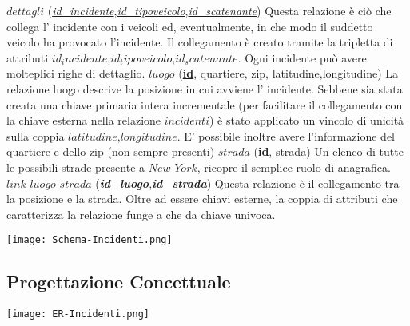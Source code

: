 \documentclass[12pt, a4paper]{scrartcl}
\begin{document}
\newline
$dettagli$ (\textit{\underline{id\_incidente}},\textit{\underline{id\_tipoveicolo}},\textit{\underline{id\_scatenante}})
\newline
Questa relazione è ciò che collega l' incidente con i veicoli ed, eventualmente, in che modo il suddetto veicolo ha provocato l'incidente.
Il collegamento è creato tramite la tripletta di attributi $id_incidente$,$id_tipoveicolo$,$id_scatenante$.
Ogni incidente può avere molteplici righe di dettaglio. 
\newline
\newline
$luogo$ (\textbf{\underline{id}}, quartiere, zip, latitudine,longitudine)
\newline
La relazione luogo descrive la posizione in cui avviene l' incidente.
Sebbene sia stata creata una chiave primaria intera incrementale (per facilitare il collegamento con la chiave esterna nella relazione $incidenti$) è stato applicato un vincolo di unicità sulla coppia $latitudine$,$longitudine$. E' possibile inoltre avere l'informazione del quartiere e dello zip (non sempre presenti)
\newline
\newline
$strada$ (\textbf{\underline{id}}, strada)
\newline
Un elenco di tutte le possibili strade presente a $New$ $York$, ricopre il semplice ruolo di anagrafica.
\newline
\newline
$link\_luogo\_strada$ (\textit{\textbf{\underline{id\_luogo}}},\textit{\textbf{\underline{id\_strada}}})
\newline
Questa relazione è il collegamento tra la posizione e la strada. Oltre ad essere chiavi esterne, la coppia di attributi che caratterizza la relazione funge a che da chiave univoca.
\newline
\newline
\begin{center}

\texttt{[image: Schema-Incidenti.png]}
\end{center}
\subsection*{Progettazione Concettuale}
\begin{center}

\texttt{[image: ER-Incidenti.png]}
\end{center}
\end{document}
